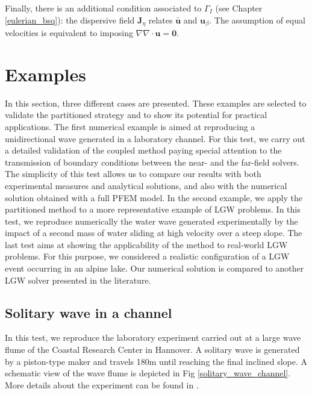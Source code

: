 Finally, there is an additional condition associated to $\Gamma_I$ (see Chapter \ref{eulerian_bsq}): the dispersive field $\mathbf{J}_\eta$ relates $\bar{\mathbf{u}}$ and $\mathbf{u}_\beta$. The assumption of equal velocities is equivalent to imposing $\nabla\nabla\cdot\mathbf{u}=\mathbf{0}$.



\section{Examples}




In this section, three different cases are presented. These examples are selected to validate the partitioned strategy and to show its potential for practical applications. The first numerical example is aimed at reproducing a unidirectional wave generated in a laboratory channel. For this test, we carry out a detailed validation of the coupled method paying special attention to the transmission of boundary conditions between the near- and the far-field solvers. The simplicity of this test allows us to compare our results with both experimental measures and analytical solutions, and also with the numerical solution obtained with a full PFEM model. In the second example, we apply the partitioned method to a more representative example of LGW problems.  In this test, we reproduce numerically the water wave generated experimentally by the impact of a second mass of water sliding at high velocity over a steep slope. The last test aims at showing the applicability of the method to real-world LGW problems. For this purpose, we considered a realistic configuration of a LGW event occurring in an alpine lake. Our numerical solution is compared to another LGW solver presented in the literature.



\subsection{Solitary wave in a channel}
\label{Example1}

In this test, we reproduce the laboratory experiment carried out at a large wave flume of the Coastal Research Center in Hannover. A solitary wave is generated by a piston-type maker and travels 180m until reaching the final inclined slope. A schematic view of the wave flume is depicted in Fig \ref{solitary_wave_channel}. More details about the experiment can be found in \cite{krautwald2020,krautwald2022,krautwald2021}.

